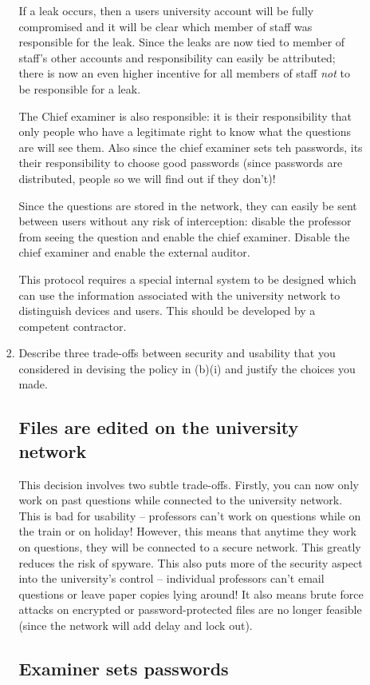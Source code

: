 \documentclass[10pt,\jkfside,a4paper]{article}
\begin{document}
\begin{enumerate}
\begin{enumerate}
\begin{enumerate}[label=(\roman*)]
If a leak occurs, then a users university account will be fully compromised and
it will be clear which member of staff was responsible for the leak. Since the
leaks are now tied to member of staff's other accounts and responsibility can easily be
attributed; there is now an even higher incentive for all members of staff \textit{not}
to be responsible for a leak.

The Chief examiner is also responsible: it is their responsibility that only people
who have a legitimate right to know what the questions are will see them. Also since the chief examiner sets teh
passwords, its their responsibility to choose good passwords (since passwords are distributed,
people so we will find out if they don't)!

Since the questions are stored in the network, they can easily be sent between users
without any risk of interception: disable the professor from seeing the question and
enable the chief examiner. Disable the chief examiner and enable the external auditor.

This protocol requires a special internal system to be designed which can use the
information associated with the university network to distinguish devices and users.
This should be developed by a competent contractor.

\item Describe three trade-offs between security and usability that you considered in 
devising the policy in (b)(i) and justify the choices you made.

\subsection*{Files are edited on the university network}

This decision involves two subtle trade-offs. Firstly, you can now only work
on past questions while connected to the university network. This is bad for
usability -- professors can't work on questions while on the train or on
holiday! However, this means that anytime they work on questions, they will
be connected to a secure network. This greatly reduces the risk of spyware.
This also puts more of the security aspect into the university's control --
individual professors can't email questions or leave paper copies lying
around! It also means brute force attacks on encrypted or password-protected
files are no longer feasible (since the network will add delay and lock out).

\subsection*{Examiner sets passwords}


\end{enumerate}
\end{enumerate}
\end{enumerate}
\end{document}
